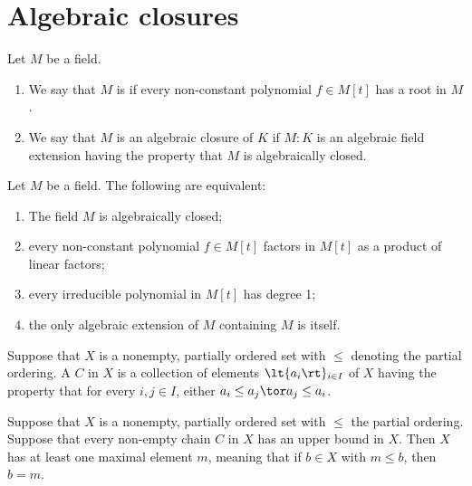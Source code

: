 \documentclass{article}
\begin{document}
\section{Algebraic closures}
  \begin{tdefinition}
    Let \( M \) be a field.
    \begin{enumerate}[label=(\roman*)]
      \item We say that \( M \) is  if every non-constant polynomial \( f\in M[t] \) has a root in \( M \).
      \item We say that \( M \) is an algebraic closure of \( K \) if \( M:K \) is an algebraic field extension having the property that \( M \) is algebraically closed.
    \end{enumerate}
  \end{tdefinition}

  \begin{tlemma}
    Let \( M \) be a field.
    The following are equivalent: \begin{enumerate}[label=(\roman*)]
      \item The field \( M \) is algebraically closed;
      \item every non-constant polynomial \( f\in M[t] \) factors in \( M[t] \) as a product of linear factors;
      \item every irreducible polynomial in \( M[t] \) has degree 1;
      \item the only algebraic extension of \( M \) containing \( M \) is itself.
    \end{enumerate}
  \end{tlemma}

  \begin{tdefinition}[Chain]
    Suppose that \( X \) is a nonempty, partially ordered set with \( \leq \) denoting the partial ordering.
    A  \( C \) in \( X \) is a collection of elements \( \lt\{ a_i \rt\}_{i\in I} \) of \( X \) having the property that for every \( i,j\in I \), either \( a_i\leq a_j \tor a_j\leq a_i \).
  \end{tdefinition}

  \quad Suppose that \( X \) is a nonempty, partially ordered set with \( \leq \) the partial ordering.
  Suppose that every non-empty chain \( C \) in \( X \) has an upper bound in \( X \).
  Then \( X \) has at least one maximal element \( m \), meaning that if \( b\in X \) with \( m\leq b \), then \( b=m \).
\end{document}
